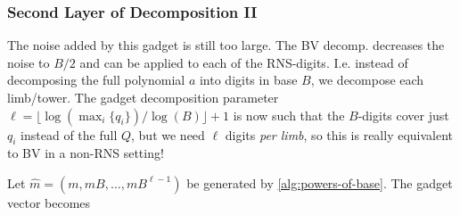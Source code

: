     
    
    \subsubsection{Second Layer of Decomposition II}
    The noise added by this gadget is still too large. The BV decomp. decreases the noise to $B/2$ and can be applied to each of the RNS-digits. I.e. instead of decomposing the full polynomial $a$ into digits in base $B$, we decompose each limb/tower. The gadget decomposition parameter $\ell = \lfloor\log(\max_i\{q_i\})/\log(B)\rfloor + 1$ is now such that the $B$-digits cover just $q_i$ instead of the full $Q$, but we need $\ell$ digits \textit{per limb}, so this is really equivalent to BV in a non-RNS setting!
    
    
    
    Let $\hat{m} = (m, mB, \dots, mB^{\ell-1})$ be generated by \autoref{alg:powers-of-base}. The gadget vector becomes
    
    
    \newpage
\fi

\ifnotes
    \newpage
    \newpage
    \newcommand{\coef}[2]{c_{#1}\bmod{q_{#2}}}
    
